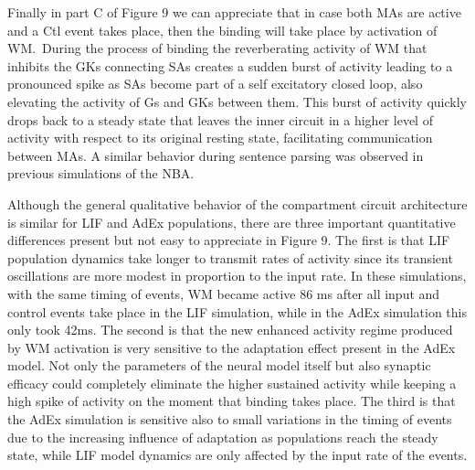 \documentclass[10pt]{article}
\begin{document}
Finally in part C of Figure 9 we can appreciate that in case both MAs
are active and a Ctl event takes place, then the binding will take place
by activation of WM.~During the process of binding the reverberating
activity of WM that inhibits the GKs connecting SAs creates a sudden
burst of activity leading to a pronounced spike as SAs become part of a
self excitatory closed loop, also elevating the activity of Gs and GKs
between them. This burst of activity quickly drops back to a steady
state that leaves the inner circuit in a higher level of activity with
respect to its original resting state, facilitating communication
between MAs. A similar behavior during sentence parsing was observed in
previous simulations of the NBA\cite{Frank_2014}.

Although the general qualitative behavior of the compartment circuit
architecture is similar for LIF and AdEx populations, there are three
important quantitative differences present but not easy to appreciate in
Figure 9. The first is that LIF population dynamics take longer to
transmit rates of activity since its transient oscillations are more
modest in proportion to the input rate. In these simulations, with the
same timing of events, WM became active 86 ms after all input and
control events take place in the LIF simulation, while in the AdEx
simulation this only took 42ms. The second is that the new enhanced
activity regime produced by WM activation is very sensitive to the
adaptation effect present in the AdEx model. Not only the parameters of
the neural model itself but also synaptic efficacy could completely
eliminate the higher sustained activity while keeping a high spike of
activity on the moment that binding takes place. The third is that the
AdEx simulation is sensitive also to small variations in the timing of
events due to the increasing influence of adaptation as populations
reach the steady state, while LIF model dynamics are only affected by
the input rate of the events.
\end{document}
